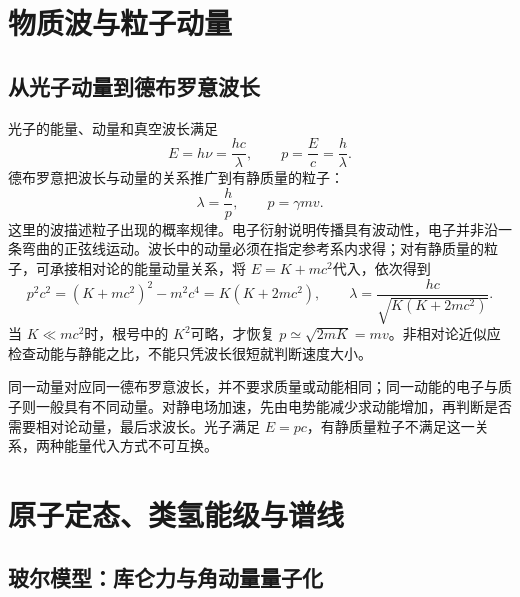 \section{物质波与粒子动量}

\subsection{从光子动量到德布罗意波长}

光子的能量、动量和真空波长满足
\[
 E=h\nu=\frac{hc}{\lambda},\qquad p=\frac Ec=\frac h\lambda.
\]
德布罗意把波长与动量的关系推广到有静质量的粒子：
\[
 \boxed{\lambda=\frac hp},\qquad p=\gamma mv.
\]
这里的波描述粒子出现的概率规律。电子衍射说明传播具有波动性，电子并非沿一条弯曲的正弦线运动。波长中的动量必须在指定参考系内求得；对有静质量的粒子，可承接相对论的能量动量关系，将 $E=K+mc^2$代入，依次得到
\[
 p^2c^2=(K+mc^2)^2-m^2c^4=K(K+2mc^2),
 \qquad \lambda=\frac{hc}{\sqrt{K(K+2mc^2)}}.
\]
当 $K\ll mc^2$时，根号中的 $K^2$可略，才恢复 $p\simeq\sqrt{2mK}=mv$。非相对论近似应检查动能与静能之比，不能只凭波长很短就判断速度大小。

同一动量对应同一德布罗意波长，并不要求质量或动能相同；同一动能的电子与质子则一般具有不同动量。对静电场加速，先由电势能减少求动能增加，再判断是否需要相对论动量，最后求波长。光子满足 $E=pc$，有静质量粒子不满足这一关系，两种能量代入方式不可互换。



\section{原子定态、类氢能级与谱线}

\subsection{玻尔模型：库仑力与角动量量子化}

